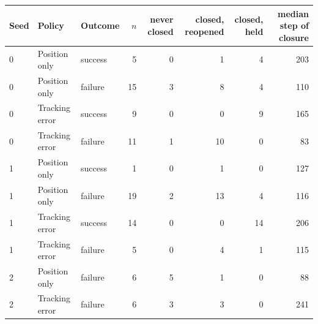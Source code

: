 \begin{tabular}{lllrrrrr}
\toprule
Seed & Policy & Outcome & $n$ & never closed & closed, reopened & closed, held & median step of closure \\
\midrule
0 & Position only & success & 5 & 0 & 1 & 4 & 203 \\
0 & Position only & failure & 15 & 3 & 8 & 4 & 110 \\
0 & Tracking error & success & 9 & 0 & 0 & 9 & 165 \\
0 & Tracking error & failure & 11 & 1 & 10 & 0 & 83 \\
1 & Position only & success & 1 & 0 & 1 & 0 & 127 \\
1 & Position only & failure & 19 & 2 & 13 & 4 & 116 \\
1 & Tracking error & success & 14 & 0 & 0 & 14 & 206 \\
1 & Tracking error & failure & 5 & 0 & 4 & 1 & 115 \\
2 & Position only & failure & 6 & 5 & 1 & 0 & 88 \\
2 & Tracking error & failure & 6 & 3 & 3 & 0 & 241 \\
\bottomrule
\end{tabular}
